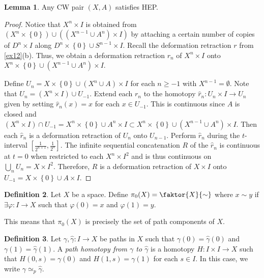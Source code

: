 \documentclass[10pt,letterpaper,cm]{nupset}
\theoremstyle{definition}
\newtheorem{definition}{Definition}[subsection]
\theoremstyle{theorem}
\newtheorem{lemma}[definition]{Lemma}
\theoremstyle{remark}
\newcommand{\1}{\mathbb{1}}
\newcommand{\0}{\vec 0}
\begin{document}
\begin{lemma}
Any CW pair $\left(X,A\right)$ satisfies HEP.
\end{lemma}
\begin{proof}
Notice that $X^n \times I$ is obtained from $\left(X^n \times \left\{0\right\}\right) \cup \left(\left(X^{n-1} \cup A^n\right) \times I\right)$ by attaching a certain number of copies of $D^n \times I$ along $D^n \times \left\{0\right\} \cup S^{n-1} \times I$. Recall the deformation retraction $r$ from  \cref{ex12}(b). Thus, we obtain a deformation retraction $r_n$ of $X^n \times I$ onto $X^n \times \left\{0\right\} \cup \left(X^{n-1} \cup A^n\right) \times I$.

Define $U_n = X\times \left\{0\right\} \cup (X^n \cup A) \times I$ for each $n\geq -1$ with $X^{n-1} = \emptyset$. Note that $U_n = \left(X^n \times I\right) \cup U_{-1}$. Extend each $r_n$ to the homotopy $\hat{r}_n : U_n \times I \to U_n$ given by setting $\hat{r}_n(x) = x$ for each $x\in U_{-1}$. This is continuous since $A$ is closed and $\left(X^n \times I\right) \cap U_{-1} = X^n \times \left\{0\right\} \cup A^n \times I \subset X^n \times \left\{0\right\} \cup \left(X^{n-1} \cup A^n\right) \times I$. Then each $\hat{r}_n$ is a deformation retraction of $U_n$ onto $U_{n-1}$.  Perform $\hat{r}_n$ during the $t$-interval $\left[\frac{1}{2^{n+1}}, \frac{1}{2^n}\right]$.  The infinite sequential concatenation $R$ of the $\hat{r}_n$ is continuous at $t=0$ when restricted to each $X^n \times I^2$  and is thus continuous on $\bigcup_n U_n = X \times I^2$. Therefore, $R$ is a deformation retraction of $X\times I$ onto $U_{-1} = X\times \left\{0\right\} \cup A\times I$.
\end{proof}

\begin{definition}
Let $X$ be a space. Define $\pi_0(X) = \faktor{X}{\sim} $ where $x\sim y$ if $\exists \varphi: I \to X$ such that $\varphi(0)=x$ and $\varphi(1) = y$.
\end{definition}

This means that $\pi_0(X)$ is precisely the set of path components of $X$.

\begin{definition}
Let $\gamma, \hat{\gamma}: I \to X$ be paths in $X$ such that $\gamma(0) = \hat{\gamma}(0)$ and $\gamma(1) = \hat{\gamma}(1)$.  A \textit{path homotopy from $\gamma$ to $\hat{\gamma}$} is a homotopy $H: I \times I \to X$ such that $H(0,s) = \gamma(0)$ and $H(1,s) = \gamma(1)$ for each $s\in I$. In this case, we write $\gamma \simeq_p \hat{\gamma}$.
\end{definition}
\end{document}
